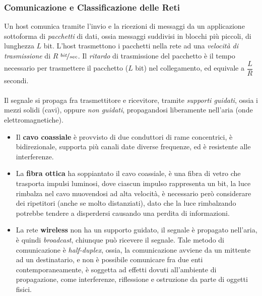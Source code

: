 \documentclass[12pt, letterpaper]{article}
\newcommand{\acc}{\\\hphantom{}\\}
\begin{document}
\subsubsection{Comunicazione e Classificazione delle Reti}
Un host comunica tramite l'invio e la ricezioni di messaggi da un applicazione sottoforma di \textit{pacchetti} di dati, ossia 
messaggi suddivisi in blocchi più piccoli, di lunghezza $L$ bit. L'host trasmettono i pacchetti nella rete 
ad una \textit{velocità di trasmissione} di $R$ $\nicefrac{bit}{sec}$. Il \textit{ritardo} di trasmissione del pacchetto è 
il tempo necessario per trasmettere il pacchetto ($L$ bit) nel collegamento, ed equivale a $\dfrac{L}{R}$ secondi.\acc 
Il segnale si propaga fra trasmettitore e ricevitore, tramite \textit{supporti guidati}, ossia i mezzi solidi (cavi), oppure 
 \textit{non guidati}, propagandosi liberamente nell'aria (onde elettromagnetiche).\begin{itemize}
    \item Il \textbf{cavo coassiale} è provvisto di due conduttori di rame concentrici, è bidirezionale, supporta più canali
    date diverse frequenze, ed è resistente alle interferenze. 
    \item La \textbf{fibra ottica} ha soppiantato il cavo coassiale, è una fibra di vetro che trasporta impulsi luminosi, dove ciascun 
    impulso rappresenta un bit, la luce rimbalza nel cavo muovendosi ad alta velocità, è necessario però considerare dei 
    ripetitori (anche se molto distanziati), dato che la luce rimbalzando potrebbe tendere a disperdersi causando una perdita 
    di informazioni.
    \item La rete \textbf{wireless} non ha un supporto guidato, il segnale è propagato nell'aria, è quindi \textit{broadcast},  
    chiunque può ricevere il segnale. Tale metodo di comunicazione è \textit{half-duplex}, ossia, la comunicazione avviene da un 
    mittente ad un destinatario, e non è possibile comunicare fra due enti contemporaneamente, è soggetta ad effetti dovuti all'ambiente 
    di propagazione, come interferenze, riflessione e ostruzione da parte di oggetti fisici.
 \end{itemize}
\end{document}
